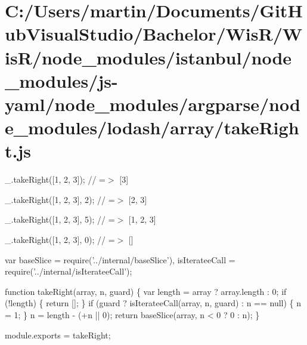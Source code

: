 \hypertarget{_c_1_2_users_2martin_2_documents_2_git_hub_visual_studio_2_bachelor_2_wis_r_2_wis_r_2node_module242b2be171372ef6272c897827747cf5}{}\section{C\+:/\+Users/martin/\+Documents/\+Git\+Hub\+Visual\+Studio/\+Bachelor/\+Wis\+R/\+Wis\+R/node\+\_\+modules/istanbul/node\+\_\+modules/js-\/yaml/node\+\_\+modules/argparse/node\+\_\+modules/lodash/array/take\+Right.\+js}
\+\_\+.\+take\+Right(\mbox{[}1, 2, 3\mbox{]}); // =$>$ \mbox{[}3\mbox{]}

\+\_\+.\+take\+Right(\mbox{[}1, 2, 3\mbox{]}, 2); // =$>$ \mbox{[}2, 3\mbox{]}

\+\_\+.\+take\+Right(\mbox{[}1, 2, 3\mbox{]}, 5); // =$>$ \mbox{[}1, 2, 3\mbox{]}

\+\_\+.\+take\+Right(\mbox{[}1, 2, 3\mbox{]}, 0); // =$>$ \mbox{[}\mbox{]}


\begin{DoxyCodeInclude}
var baseSlice = require(\textcolor{stringliteral}{'../internal/baseSlice'}),
    isIterateeCall = require(\textcolor{stringliteral}{'../internal/isIterateeCall'});

\textcolor{keyword}{function} takeRight(array, n, guard) \{
  var length = array ? array.length : 0;
  \textcolor{keywordflow}{if} (!length) \{
    \textcolor{keywordflow}{return} [];
  \}
  \textcolor{keywordflow}{if} (guard ? isIterateeCall(array, n, guard) : n == null) \{
    n = 1;
  \}
  n = length - (+n || 0);
  \textcolor{keywordflow}{return} baseSlice(array, n < 0 ? 0 : n);
\}

module.exports = takeRight;
\end{DoxyCodeInclude}
 